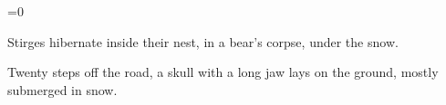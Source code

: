 
\ifnum\value{temperature}=0

  Stirges hibernate inside their nest, in a bear's corpse, under the \gls{snow}.

  \begin{boxtext}
    Twenty \glspl{step} off the road, a skull with a long jaw lays on the ground, mostly submerged in \gls{snow}.
  \end{boxtext}
  \label{\jobname:harvestStirge}

\fi


